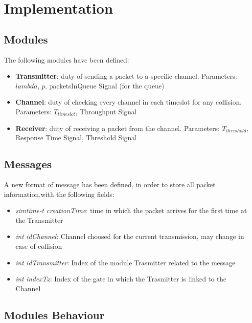 \section{Implementation}
\subsection{Modules}
The following modules have been defined:
\begin{itemize}
	\item \textbf{Transmitter}: duty of sending a packet to a specific channel. Parameters: $lambda$, $p$, packetsInQueue Signal (for the queue)
	\item \textbf{Channel}: duty of checking every channel in each timeslot for any collision. Parameters: $T_{timeslot}$, Throughput Signal
	\item \textbf{Receiver}: duty of receiving a packet from the channel. Parameters: $T_{threshold}$, Response Time Signal, Threshold Signal
\end{itemize}
\subsection{Messages}
A new format of message has been defined, in order to store all packet information,with the following fields:
\begin{itemize}
	\item \textit{simtime-t creationTime}: time in which the packet arrives for the first time at the Transmitter
	\item \textit{int idChannel}: Channel choosed for the current transmission, may change in case of collision
	\item \textit{int idTransmitter}: Index of the module Trasmitter related to the message
	\item \textit{int indexTx}: Index of the gate in which the Trasmitter is linked to the Channel
\end{itemize}

\subsection{Modules Behaviour}
